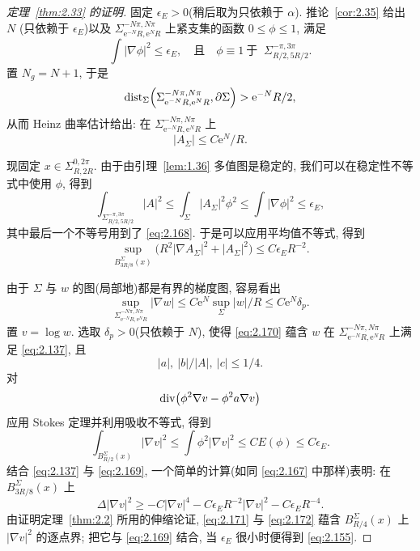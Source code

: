 \begin{proof}[定理~\ref{thm:2.33} 的证明]
固定 $\epsilon_E>0$(稍后取为只依赖于 $\alpha$). 推论~\ref{cor:2.35} 给出 $N$
(只依赖于 $\epsilon_E$)以及
$\Sigma^{-N\pi,N\pi}_{\mathrm{e}^{-N}R,\mathrm{e}^{N}R}$ 上紧支集的函数
$0\leq\phi\leq1$, 满足
\begin{equation}
\int|\nabla\phi|^{2}\leq\epsilon_E,
\quad\text{且}\quad
\phi\equiv1\ \text{于 }\ \Sigma^{-\pi,3\pi}_{R/2,5R/2}.
\label{eq:2.168}
\end{equation}
置 $N_g=N+1$, 于是
\[
\operatorname{dist}_{\Sigma}\Bigl(\Sigma^{-N\pi,N\pi}_{\mathrm{e}^{-N}R,\mathrm{e}^{N}R},
 \partial\Sigma\Bigr)>\mathrm{e}^{-N}R/2,
\]
从而 Heinz 曲率估计给出: 在
$\Sigma^{-N\pi,N\pi}_{\mathrm{e}^{-N}R,\mathrm{e}^{N}R}$ 上
\[
|A_{\Sigma}|\leq C\mathrm{e}^{N}/R.
\]

现固定 $x\in\Sigma^{0,2\pi}_{R,2R}$. 由于由引理~\ref{lem:1.36} 多值图是稳定的,
我们可以在稳定性不等式中使用 $\phi$, 得到
\[
\int_{\Sigma^{-\pi,3\pi}_{R/2,5R/2}}|A|^{2}
 \leq\int_\Sigma|A_{\Sigma}|^{2}\phi^{2}\leq\int|\nabla\phi|^{2}
 \leq\epsilon_E,
\]
其中最后一个不等号用到了 \eqref{eq:2.168}. 于是可以应用平均值不等式, 得到
\begin{equation}
\sup_{B_{3R/8}^{\Sigma}(x)}
 \bigl(R^{2}|\nabla A_{\Sigma}|^{2}+|A_{\Sigma}|^{2}\bigr)
 \leq C\epsilon_ER^{-2}.
\label{eq:2.169}
\end{equation}

由于 $\Sigma$ 与 $w$ 的图(局部地)都是有界的梯度图, 容易看出
\begin{equation}
\sup_{\Sigma^{-N\pi,N\pi}_{\mathrm{e}^{-N}R,\mathrm{e}^{N}R}}|\nabla w|
 \leq C\mathrm{e}^{N}\sup_\Sigma|w|/R
 \leq C\mathrm{e}^{N}\delta_p.
\label{eq:2.170}
\end{equation}
置 $v=\log w$. 选取 $\delta_p>0$(只依赖于 $N$), 使得 \eqref{eq:2.170} 蕴含 $w$ 在
$\Sigma^{-N\pi,N\pi}_{\mathrm{e}^{-N}R,\mathrm{e}^{N}R}$ 上满足 \eqref{eq:2.137}, 且
\[
|a|,\ |b|/|A|,\ |c|\leq1/4.
\]
对
\[
\operatorname{div}\bigl(\phi^{2}\nabla v-\phi^{2}a\nabla v\bigr)
\]
应用 Stokes 定理并利用吸收不等式, 得到
\begin{equation}
\int_{B_{R/2}^{\Sigma}(x)}|\nabla v|^{2}
 \leq\int\phi^{2}|\nabla v|^{2}\leq CE(\phi)\leq C\epsilon_E.
\label{eq:2.171}
\end{equation}
结合 \eqref{eq:2.137} 与 \eqref{eq:2.169}, 一个简单的计算(如同 \eqref{eq:2.167} 中那样)表明: 在
$B_{3R/8}^{\Sigma}(x)$ 上
\begin{equation}
\Delta|\nabla v|^{2}
 \geq-C|\nabla v|^{4}-C\epsilon_ER^{-2}|\nabla v|^{2}
 -C\epsilon_ER^{-4}.
\label{eq:2.172}
\end{equation}
由证明定理~\ref{thm:2.2} 所用的伸缩论证, \eqref{eq:2.171} 与 \eqref{eq:2.172} 蕴含
$B_{R/4}^{\Sigma}(x)$ 上 $|\nabla v|^{2}$ 的逐点界; 把它与 \eqref{eq:2.169} 结合, 当
$\epsilon_E$ 很小时便得到 \eqref{eq:2.155}.


\end{proof}
